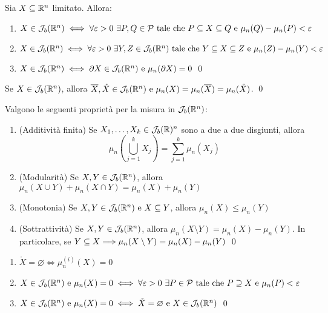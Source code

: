 \begin{theorem}
    Sia $X\subseteq \mathbb{R}^n$ limitato. Allora:
    \begin{enumerate}
        \item $X\in \mathcal{J}_b(\mathbb{R}^n) \iff \forall \varepsilon > 0 \ \exists P,Q \in \mathcal{P} \text{ tale che } P \subseteq X \subseteq Q \text{ e } \mu_n(Q)-\mu_n(P) < \varepsilon$
        \item $X \in \mathcal{J}_b(\mathbb{R}^n) \iff \forall \varepsilon > 0 \ \exists Y,Z \in \mathcal{J}_b(\mathbb{R}^n) \text{ tale che } Y \subseteq X \subseteq Z \text{ e } \mu_n(Z)-\mu_n(Y) < \varepsilon$
        \item $X \in \mathcal{J}_b(\mathbb{R}^n)\iff \partial X \in \mathcal{J}_b(\mathbb{R}^n) \text{ e } \mu_n(\partial X)=0$
        \qed
    \end{enumerate}
\end{theorem}

\begin{corollary}
    Se $X \in \mathcal{J}_b(\mathbb{R}^n)$, allora $\overline{X},\mathring X \in \mathcal{J}_b(\mathbb{R}^n) \text{ e } \mu_n(X)=\mu_n(\overline{X})=\mu_n(\mathring X)$.
    \qed
\end{corollary}

\begin{theorem}
    [Proprietà di $\J_b(\R^n)$]
    Valgono le seguenti proprietà per la misura in $\J_b(\R^n)$:
    \begin{enumerate}
        \item (Additività finita) Se $X_1,\dots,X_k \in \mathcal{J}_b(\mathbb{R})^n$ sono a due a due disgiunti, allora
        $$
            \mu_n\left(\displaystyle \bigcup_{j=1}^kX_j\right) =   \displaystyle\sum_{j=1}^k\mu_n(X_j)
        $$
        \item (Modularità) Se $X,Y \in \mathcal{J}_b(\mathbb{R}^n)$, allora $\mu_n(X\cup Y)+\mu_n(X\cap Y)=\mu_n(X)+\mu_n(Y)$
        \item (Monotonia) Se $X,Y \in \mathcal{J}_b(\mathbb{R}^n) \text{ e } X \subseteq Y$, allora $\mu_n(X) \leq \mu_n(Y)$
        \item (Sottrattività) Se $X,Y \in \mathcal{J}_b(\mathbb{R}^n)$, allora $\mu_n(X\setminus Y)=\mu_n(X)-\mu_n(Y)$. In particolare, se $Y \subseteq X \Longrightarrow \mu_n (X \setminus Y)=\mu_n(X)-\mu_n(Y)$
        \qed
    \end{enumerate}
\end{theorem}

\begin{theorem}
    \leavevmode
    \begin{enumerate}
        \item $\mathring X = \varnothing \iff \mu_n^{(i)}(X)=0$
        \item $X \in \mathcal{J}_b(\mathbb{R}^n) \text{ e } \mu_n(X)=0 \iff \forall \varepsilon >0 \ \exists P \in \mathcal{P} \text{ tale che } P \supseteq X \text{ e } \mu_n(P)< \varepsilon$
        \item $X \in \mathcal{J}_b(\mathbb{R}^n) \text{ e } \mu_n(X)=0 \iff \mathring X = \varnothing \text{ e } X \in \mathcal{J}_b(\mathbb{R}^n)$
        \qed
    \end{enumerate}
\end{theorem}

